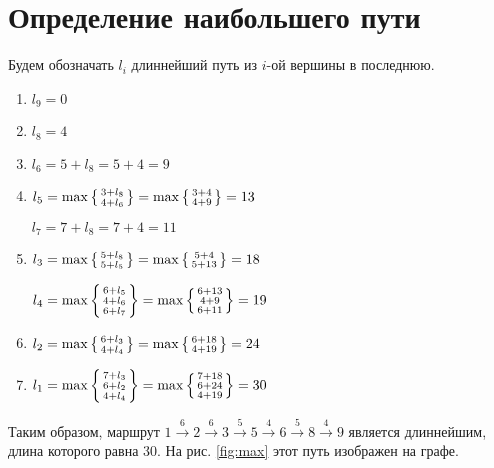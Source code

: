 \newpage

\section{Определение наибольшего пути}

Будем обозначать $l_i$ длиннейший путь из $i$-ой вершины в последнюю.

\begin{enumerate}
	\item[$A_7$\ ] $l_9 = 0$
	\item[$A_6$\ ] $l_8 = 4$
	\item[$A_5$\ ] $l_6 = 5 + l_8 = 5 + 4 = 9$
	\item[$A_4$\ ] $l_5 = \max\two{3 + l_8}{4 + l_6} = \max\two{3 + 4}{4 + 9} = 13$
	
	$l_7 = 7 + l_8 = 7 + 4 = 11$
	\item[$A_3$\ ] $l_3 = \max\two{5 + l_8}{5 + l_5} = \max\two{5 + 4}{5 + 13} = 18$
	
	$l_4 = \max\three{6 + l_5}{4 + l_6}{6 + l_7} = \max\three{6 + 13}{4 + 9}{6 + 11} = 19$
	\item[$A_2$\ ] $l_2 = \max\two{6 + l_3}{4 + l_4} = \max\two{6 + 18}{4 + 19} = 24$
	\item[$A_1$\ ] $l_1 = \max\three{7 + l_3}{6 + l_2}{4 + l_4} = \max\three{7 + 18}{6 + 24}{4 + 19} = 30$
\end{enumerate}

Таким образом, маршрут $1 \xrightarrow{6} 2 \xrightarrow{6} 3 \xrightarrow{5} 5 \xrightarrow{4} 6 \xrightarrow{5} 8 \xrightarrow{4} 9$ является длиннейшим, длина которого равна $30$. На рис. \ref{fig:max} этот путь изображен на графе.

